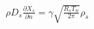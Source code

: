\documentclass[10pt]{article}
\begin{document}
\begin{align*}\rho D_{s} \frac{\partial X_{s}}{\partial n} =  \gamma \sqrt{ \frac{ R_{s} T_{w}}{ 2 \pi} } \rho_{s}\end{align*}
\end{document}

